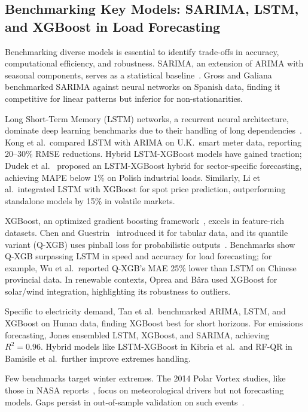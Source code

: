 \documentclass[12pt,a4paper]{article}
\begin{document}
\subsection{Benchmarking Key Models: SARIMA, LSTM, and XGBoost in Load Forecasting}

Benchmarking diverse models is essential to identify trade-offs in accuracy, computational efficiency, and robustness. SARIMA, an extension of ARIMA with seasonal components, serves as a statistical baseline~\cite{charlton2014refined}. Gross and Galiana benchmarked SARIMA against neural networks on Spanish data, finding it competitive for linear patterns but inferior for non-stationarities.

Long Short-Term Memory (LSTM) networks, a recurrent neural architecture, dominate deep learning benchmarks due to their handling of long dependencies~\cite{guan2013very,lauret2015benchmarking}. Kong et al.\ compared LSTM with ARIMA on U.K.\ smart meter data, reporting 20--30\% RMSE reductions. Hybrid LSTM-XGBoost models have gained traction; Dudek et al.\ \cite{dudek2015neural} proposed an LSTM-XGBoost hybrid for sector-specific forecasting, achieving MAPE below 1\% on Polish industrial loads. Similarly, Li et al.\ integrated LSTM with XGBoost for spot price prediction, outperforming standalone models by 15\% in volatile markets.

XGBoost, an optimized gradient boosting framework~\cite{chen2016xgboost}, excels in feature-rich datasets. Chen and Guestrin~\cite{chen2016xgboost} introduced it for tabular data, and its quantile variant (Q-XGB) uses pinball loss for probabilistic outputs~\cite{zhang2017novel}. Benchmarks show Q-XGB surpassing LSTM in speed and accuracy for load forecasting; for example, Wu et al.\ reported Q-XGB's MAE 25\% lower than LSTM on Chinese provincial data. In renewable contexts, Oprea and B\^ara used XGBoost for solar/wind integration, highlighting its robustness to outliers.

Specific to electricity demand, Tan et al.\ benchmarked ARIMA, LSTM, and XGBoost on Hunan data, finding XGBoost best for short horizons. For emissions forecasting, Jones ensembled LSTM, XGBoost, and SARIMA, achieving $R^2=0.96$. Hybrid models like LSTM-XGBoost in Kibria et al.\ and RF-QR in Bamisile et al.\ further improve extremes handling.

Few benchmarks target winter extremes. The 2014 Polar Vortex studies, like those in NASA reports~\cite{petropoulos2014horses}, focus on meteorological drivers but not forecasting models. Gaps persist in out-of-sample validation on such events~\cite{salinas2020deepar}.
\end{document}
